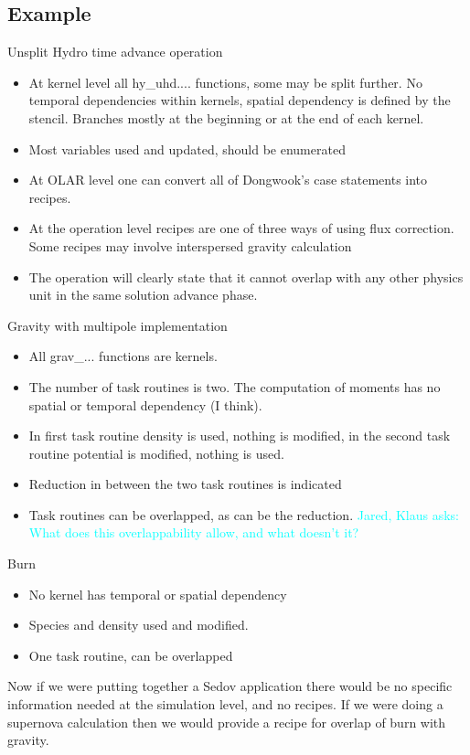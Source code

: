 \documentclass{article}
\newcommand{\JaredQfromKW}[1]   {\textcolor{cyan}{Jared, Klaus asks: #1}}
\newcommand{\shortOLAR}  {OLAR\xspace}
\newcommand{\OLAR}   {\shortOLAR}             %
\newcommand{\taskroutine}        {task routine\xspace}
\newcommand{\taskroutines}       {task routines\xspace}
\newcommand{\Taskroutines}       {Task routines\xspace}
\begin{document}
\subsection{Example}
Unsplit Hydro time advance operation
\begin {itemize}
\item At kernel level all hy\_uhd.... functions, some may be split
  further.  No temporal dependencies within kernels, spatial dependency
  is defined by the stencil. Branches mostly at the beginning or at
  the end of each kernel.
\item Most variables used and updated, should be enumerated
\item At \OLAR level one can convert all of Dongwook's case statements
  into recipes.
\item At the operation level recipes are one of three ways of using flux
  correction. Some recipes may involve interspersed gravity
  calculation
\item The operation will clearly state that it cannot overlap with any
  other physics unit in the same solution advance phase. %
\end{itemize}
Gravity with multipole implementation
\begin{itemize}
\item All grav\_... functions are kernels.
\item The number of \taskroutines is two. The computation of moments has no
  spatial or temporal dependency (I think).
\item In first \taskroutine density is used, nothing is modified, in the
  second \taskroutine potential is modified, nothing is used.
\item Reduction in between the two \taskroutines is indicated
\item \Taskroutines can be overlapped, as can be the reduction.
\JaredQfromKW{What does this overlappability allow, and what doesn't it?}
\end{itemize}
Burn
\begin{itemize}
\item No kernel has temporal or spatial dependency
\item Species and density used and modified.
\item One \taskroutine, can be overlapped
\end{itemize}

Now if we were putting together a Sedov application there would be no
specific information needed at the simulation level, and no
recipes. If we were doing a supernova calculation then we would
provide a recipe for overlap of burn with gravity.
\end{document}
